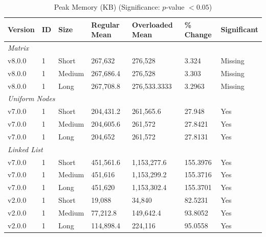 \begin{table}[H]\caption{Peak Memory (KB) (Significance: $p$-value $<0.05$)}
\centering\footnotesize\setlength{\tabcolsep}{4pt}\renewcommand{\arraystretch}{1.15}
\begin{tabular}{lllllll}
\toprule
Version & ID & Size & Regular Mean & Overloaded Mean & \% Change & Significant \\ \midrule
\multicolumn{7}{l}{\textit{Matrix}} \\
v8.0.0 & 1 & Short & 267,632 & 276,528 & 3.324 & Missing \\
v8.0.0 & 1 & Medium & 267,686.4 & 276,528 & 3.303 & Missing \\
v8.0.0 & 1 & Long & 267,708.8 & 276,533.3333 & 3.2963 & Missing \\
\multicolumn{7}{l}{\textit{Uniform Nodes}} \\
v7.0.0 & 1 & Short & 204,431.2 & 261,565.6 & 27.948 & Yes \\
v7.0.0 & 1 & Medium & 204,605.6 & 261,572 & 27.8421 & Yes \\
v7.0.0 & 1 & Long & 204,652 & 261,572 & 27.8131 & Yes \\
\multicolumn{7}{l}{\textit{Linked List}} \\
v7.0.0 & 1 & Short & 451,561.6 & 1,153,277.6 & 155.3976 & Yes \\
v7.0.0 & 1 & Medium & 451,616 & 1,153,299.2 & 155.3716 & Yes \\
v7.0.0 & 1 & Long & 451,620 & 1,153,302.4 & 155.3701 & Yes \\
v2.0.0 & 1 & Short & 19,088 & 34,840 & 82.5231 & Yes \\
v2.0.0 & 1 & Medium & 77,212.8 & 149,642.4 & 93.8052 & Yes \\
v2.0.0 & 1 & Long & 114,898.4 & 224,116 & 95.0558 & Yes \\
\bottomrule\end{tabular}
\label{PeakMemoryMetrics}
\par\smallskip\parbox{0.95\textwidth}{\scriptsize}
\end{table}


